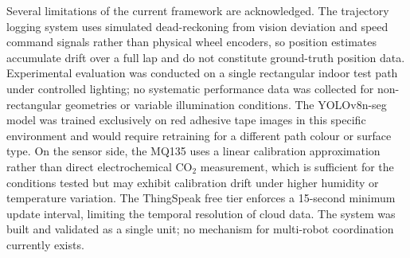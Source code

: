 Several limitations of the current framework are acknowledged. The
trajectory logging system uses simulated dead-reckoning from vision
deviation and speed command signals rather than physical wheel encoders,
so position estimates accumulate drift over a full lap and do not
constitute ground-truth position data. Experimental evaluation was
conducted on a single rectangular indoor test path under controlled
lighting; no systematic performance data was collected for
non-rectangular geometries or variable illumination conditions.
The YOLOv8n-seg model was trained exclusively on red adhesive tape
images in this specific environment and would require retraining for
a different path colour or surface type. On the sensor side, the MQ135
uses a linear calibration approximation rather than direct
electrochemical CO$_2$ measurement, which is sufficient for the
conditions tested but may exhibit calibration drift under higher
humidity or temperature variation. The ThingSpeak free tier enforces
a 15-second minimum update interval, limiting the temporal resolution
of cloud data. The system was built and validated as a single unit;
no mechanism for multi-robot coordination currently exists.